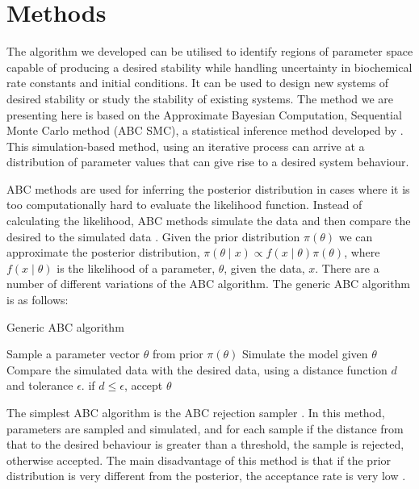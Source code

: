 \section{Methods}

The algorithm we developed can be utilised to identify regions of parameter space capable of producing a desired stability while handling uncertainty in biochemical rate constants and initial conditions. It can be used to design new systems of desired stability or study the stability of existing systems. The method we are presenting here is based on the Approximate Bayesian Computation, Sequential Monte Carlo method (ABC SMC), a statistical inference method developed by \textcite{Toni:2009tr}. This simulation-based method, using an iterative process can arrive at a distribution of parameter values that can give rise to a desired system behaviour. 

ABC methods are used for inferring the posterior distribution in cases where it is too computationally hard to evaluate the likelihood function. Instead of calculating the likelihood, ABC methods simulate the data and then compare the desired to the simulated data \autocite{Toni:2009tr}. Given the prior distribution $\pi(\theta)$ we can approximate the posterior distribution, $\pi(\theta\mid x)\propto f(x\mid\theta)\pi(\theta)$, where $f(x\mid\theta)$ is the likelihood of a parameter, $\theta$, given the data, $x$. There are a number of different variations of the ABC algorithm. The generic ABC algorithm is as follows:
	
	\begin{algorithm}[h]
	\label{alg:ABC}
  \caption{Generic ABC algorithm}
 \begin{algorithmic}[1]
    \Statex
	\State Sample a parameter vector $\theta$ from prior $\pi(\theta)$
	\State Simulate the model given $\theta$
    \State Compare the simulated data with the desired data, using a distance function $d$ and tolerance $\epsilon$. if $d \leq \epsilon$, accept $\theta$ 
   
  \end{algorithmic}
\end{algorithm}


The simplest ABC algorithm is the ABC rejection sampler \autocite{Pritchard:1999td}. In this method, parameters are sampled and simulated, and for each sample if the distance from that to the desired behaviour is greater than a threshold, the sample is rejected, otherwise accepted. The main disadvantage of this method is that if the prior distribution is very different from the posterior, the acceptance rate is very low \autocite{Toni:2009tr}. %

